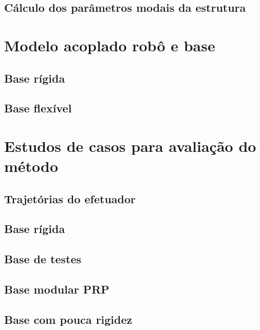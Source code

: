 \subsection{Cálculo dos parâmetros modais da estrutura}


\section{Modelo acoplado robô e base}

\subsection{Base rígida}

\subsection{Base flexível}


\section{Estudos de casos para avaliação do método}

\subsection{Trajetórias do efetuador}

\subsection{Base rígida}

\subsection{Base de testes}

\subsection{Base modular PRP}

\subsection{Base com pouca rigidez}
